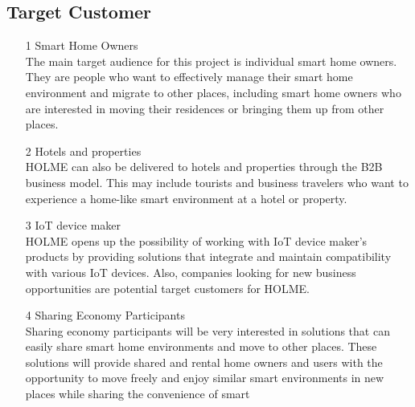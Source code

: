 \documentclass[conference]{IEEEtran}
\begin{document}
\subsection{Target Customer}
\begin{itemize}
\item [1] Smart Home Owners\\
The main target audience for this project is individual smart home owners. They are people who want to effectively manage their smart home environment and migrate to other places, including smart home owners who are interested in moving their residences or bringing them up from other places.\\
\item [2] Hotels and properties\\
HOLME can also be delivered to hotels and properties through the B2B business model. This may include tourists and business travelers who want to experience a home-like smart environment at a hotel or property.\\
\item [3] IoT device maker\\
HOLME opens up the possibility of working with IoT device maker's products by providing solutions that integrate and maintain compatibility with various IoT devices. Also, companies looking for new business opportunities are potential target customers for HOLME.\\
\item [4] Sharing Economy Participants\\
Sharing economy participants will be very interested in solutions that can easily share smart home environments and move to other places. These solutions will provide shared and rental home owners and users with the opportunity to move freely and enjoy similar smart environments in new places while sharing the convenience of smart\\
\end{itemize}
\end{document}
